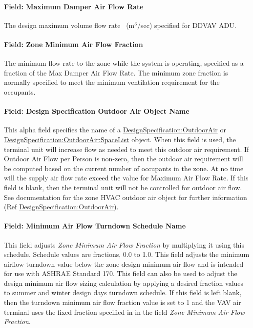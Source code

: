 \paragraph{Field: Maximum Damper Air Flow Rate}\label{field-maximum-damper-air-flow-rate}

The design maximum volume flow rate~ (m\(^{3}\)/sec) specified for DDVAV ADU.

\paragraph{Field: Zone Minimum Air Flow Fraction}\label{field-zone-minimum-air-flow-fraction-3}

The minimum flow rate to the zone while the system is operating, specified as a fraction of the Max Damper Air Flow Rate. The minimum zone fraction is normally specified to meet the minimum ventilation requirement for the occupants.

\paragraph{Field: Design Specification Outdoor Air Object Name}\label{field-design-specification-outdoor-air-object-name-2}

This alpha field specifies the name of a \hyperref[designspecificationoutdoorair]{DesignSpecification:OutdoorAir} or \hyperref[designspecificationoutdoorairspacelist]{DesignSpecification:OutdoorAir:SpaceList} object. When this field is used, the terminal unit will increase flow as needed to meet this outdoor air requirement. If Outdoor Air Flow per Person is non-zero, then the outdoor air requirement will be computed based on the current number of occupants in the zone. At no time will the supply air flow rate exceed the value for Maximum Air Flow Rate. If this field is blank, then the terminal unit will not be controlled for outdoor air flow. See documentation for the zone HVAC outdoor air object for further information (Ref \hyperref[designspecificationoutdoorair]{DesignSpecification:OutdoorAir}).

\paragraph{Field: Minimum Air Flow Turndown Schedule Name}

This field adjusts \textit{Zone Minimum Air Flow Fraction} by multiplying it using this schedule. Schedule values are fractions, 0.0 to 1.0. This field adjusts the minimum airflow turndown value below the zone design minimum air flow and is intended for use with ASHRAE Standard 170. This field can also be used to adjust the design minimum air flow sizing calculation by applying a desired fraction values to summer and winter design days turndown schedule. If this field is left blank, then the turndown minimum air flow fraction value is set to 1 and the VAV air terminal uses the fixed fraction specified in in the field \textit{Zone Minimum Air Flow Fraction}.


